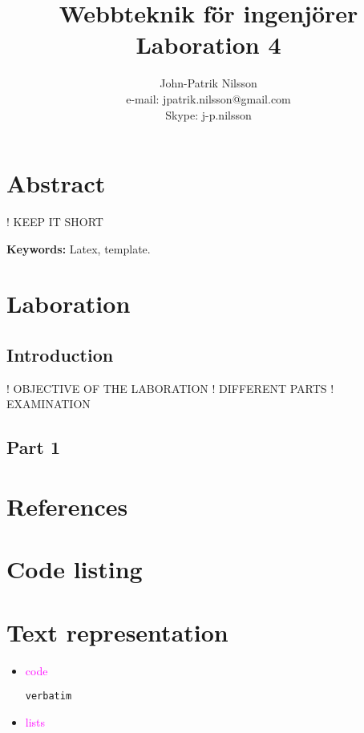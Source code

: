 \documentclass[a4paper,10pt]{article}
\title{Webbteknik för ingenjörer \\
	Laboration 4}
\author{John-Patrik Nilsson \\
	e-mail: jpatrik.nilsson@gmail.com \\
	Skype: j-p.nilsson}
\begin{document}
\maketitle

\pagestyle{empty}
\thispagestyle{empty}

\section{Abstract}
! KEEP IT SHORT

\textbf{Keywords:} Latex, template.

\section{Laboration}
\subsection{Introduction}
! OBJECTIVE OF THE LABORATION
! DIFFERENT PARTS
! EXAMINATION

\subsection{Part 1}

\appendix
\section{References}
\section{Code listing}
\section{Text representation}
\begin{itemize}
\item \textcolor{magenta}{code} 
\begin{verbatim} 
verbatim
\end{verbatim}
\item \textcolor{magenta}{lists}
\end{itemize}
\end{document}
